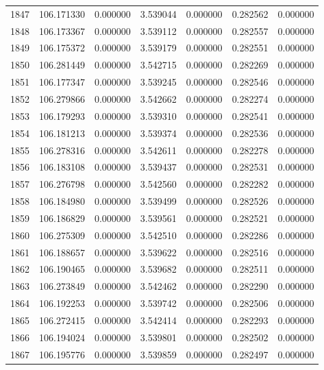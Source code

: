 \begin{tabular}{rrrrrrr}
1847 & 106.171330 &    0.000000 &  3.539044 &    0.000000 &    0.282562 &  0.000000 \\
1848 & 106.173367 &    0.000000 &  3.539112 &    0.000000 &    0.282557 &  0.000000 \\
1849 & 106.175372 &    0.000000 &  3.539179 &    0.000000 &    0.282551 &  0.000000 \\
1850 & 106.281449 &    0.000000 &  3.542715 &    0.000000 &    0.282269 &  0.000000 \\
1851 & 106.177347 &    0.000000 &  3.539245 &    0.000000 &    0.282546 &  0.000000 \\
1852 & 106.279866 &    0.000000 &  3.542662 &    0.000000 &    0.282274 &  0.000000 \\
1853 & 106.179293 &    0.000000 &  3.539310 &    0.000000 &    0.282541 &  0.000000 \\
1854 & 106.181213 &    0.000000 &  3.539374 &    0.000000 &    0.282536 &  0.000000 \\
1855 & 106.278316 &    0.000000 &  3.542611 &    0.000000 &    0.282278 &  0.000000 \\
1856 & 106.183108 &    0.000000 &  3.539437 &    0.000000 &    0.282531 &  0.000000 \\
1857 & 106.276798 &    0.000000 &  3.542560 &    0.000000 &    0.282282 &  0.000000 \\
1858 & 106.184980 &    0.000000 &  3.539499 &    0.000000 &    0.282526 &  0.000000 \\
1859 & 106.186829 &    0.000000 &  3.539561 &    0.000000 &    0.282521 &  0.000000 \\
1860 & 106.275309 &    0.000000 &  3.542510 &    0.000000 &    0.282286 &  0.000000 \\
1861 & 106.188657 &    0.000000 &  3.539622 &    0.000000 &    0.282516 &  0.000000 \\
1862 & 106.190465 &    0.000000 &  3.539682 &    0.000000 &    0.282511 &  0.000000 \\
1863 & 106.273849 &    0.000000 &  3.542462 &    0.000000 &    0.282290 &  0.000000 \\
1864 & 106.192253 &    0.000000 &  3.539742 &    0.000000 &    0.282506 &  0.000000 \\
1865 & 106.272415 &    0.000000 &  3.542414 &    0.000000 &    0.282293 &  0.000000 \\
1866 & 106.194024 &    0.000000 &  3.539801 &    0.000000 &    0.282502 &  0.000000 \\
1867 & 106.195776 &    0.000000 &  3.539859 &    0.000000 &    0.282497 &  0.000000 \\

\end{tabular}
